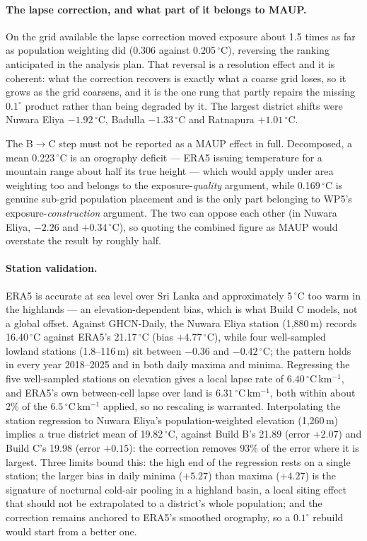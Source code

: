 \paragraph{The lapse correction, and what part of it belongs to MAUP.} On the grid available the lapse correction moved exposure about 1.5 times as far as population weighting did (0.306 against 0.205\,$^{\circ}$C), reversing the ranking anticipated in the analysis plan. That reversal is a resolution effect and it is coherent: what the correction recovers is exactly what a coarse grid loses, so it grows as the grid coarsens, and it is the one rung that partly repairs the missing $0.1^{\circ}$ product rather than being degraded by it. The largest district shifts were Nuwara Eliya $-1.92\,^{\circ}$C, Badulla $-1.33\,^{\circ}$C and Ratnapura $+1.01\,^{\circ}$C.

The B$\to$C step must not be reported as a MAUP effect in full. Decomposed, a mean 0.223\,$^{\circ}$C is an orography deficit --- ERA5 issuing temperature for a mountain range about half its true height --- which would apply under area weighting too and belongs to the exposure-\emph{quality} argument, while 0.169\,$^{\circ}$C is genuine sub-grid population placement and is the only part belonging to WP5's exposure-\emph{construction} argument. The two can oppose each other (in Nuwara Eliya, $-2.26$ and $+0.34\,^{\circ}$C), so quoting the combined figure as MAUP would overstate the result by roughly half.

\paragraph{Station validation.} ERA5 is accurate at sea level over Sri Lanka and approximately 5\,$^{\circ}$C too warm in the highlands --- an elevation-dependent bias, which is what Build C models, not a global offset. Against GHCN-Daily, the Nuwara Eliya station (1{,}880\,m) records 16.40\,$^{\circ}$C against ERA5's 21.17\,$^{\circ}$C (bias $+4.77\,^{\circ}$C), while four well-sampled lowland stations (1.8--116\,m) sit between $-0.36$ and $-0.42\,^{\circ}$C; the pattern holds in every year 2018--2025 and in both daily maxima and minima. Regressing the five well-sampled stations on elevation gives a local lapse rate of $6.40\,^{\circ}$C\,km$^{-1}$, and ERA5's own between-cell lapse over land is $6.31\,^{\circ}$C\,km$^{-1}$, both within about 2\% of the $6.5\,^{\circ}$C\,km$^{-1}$ applied, so no rescaling is warranted. Interpolating the station regression to Nuwara Eliya's population-weighted elevation (1{,}260\,m) implies a true district mean of 19.82\,$^{\circ}$C, against Build B's 21.89 (error $+2.07$) and Build C's 19.98 (error $+0.15$): the correction removes 93\% of the error where it is largest. Three limits bound this: the high end of the regression rests on a single station; the larger bias in daily minima ($+5.27$) than maxima ($+4.27$) is the signature of nocturnal cold-air pooling in a highland basin, a local siting effect that should not be extrapolated to a district's whole population; and the correction remains anchored to ERA5's smoothed orography, so a $0.1^{\circ}$ rebuild would start from a better one.

